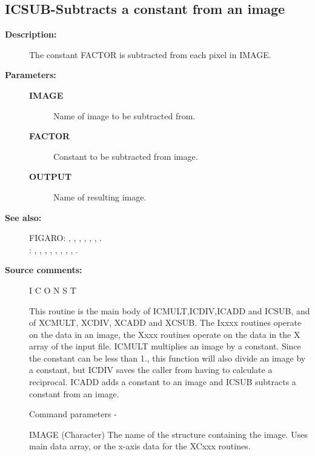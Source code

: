\begin{description}
\subsection{ICSUB-\label{ICSUB}Subtracts a constant from an image}
\begin{description}

\item [\textbf{Description:}]
 The constant FACTOR is subtracted from each pixel
 in IMAGE.

\item [\textbf{Parameters:}]
\begin{description}
\item [\textbf{IMAGE}]
 Name of image to be subtracted from.
\item [\textbf{FACTOR}]
 Constant to be subtracted from image.
\item [\textbf{OUTPUT}]
 Name of resulting image.
\end{description}

\item [\textbf{See also:}]
FIGARO: , , , , , , .\\
: , , , , , , , , .\\

\item [\textbf{Source comments:}]
\begin{terminalv}
 I C O N S T

 This routine is the main body of ICMULT,ICDIV,ICADD and ICSUB,
 and of XCMULT, XCDIV, XCADD and XCSUB.  The Ixxxx routines
 operate on the data in an image, the Xxxx routines operate on
 the data in the X array of the input file.
 ICMULT multiplies an image by a constant.  Since the constant
 can be less than 1., this function will also divide an
 image by a constant, but ICDIV saves the caller from having
 to calculate a reciprocal. ICADD adds a constant to an image and
 ICSUB subtracts a constant from an image.

 Command parameters -

 IMAGE  (Character) The name of the structure containing the image.
        Uses main data array, or the x-axis data for the XCxxx routines.


\end{terminalv}
\end{description}
\end{description}
